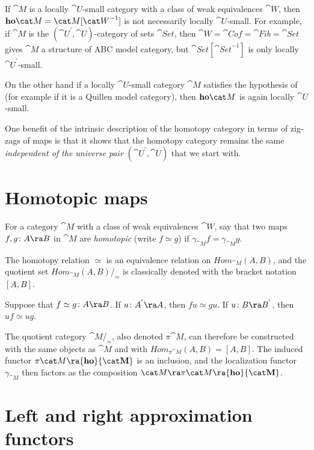 If ${\cat M}$ is a locally ${\cat U}$-small category with a class of weak equivalences ${\cat W}$, then ${\bf ho}{\cat M} = {\cat M}[{\cat W}^{-1}]$ is not necessarily locally ${\cat U}$-small. For example, if ${\cat M}$ is the $({\cat U}^{'}, {\cat U})$-category of sets ${\cat Set}$, then ${\cat W} = {\cat Cof} = {\cat Fib} = {\cat Set}$  gives ${\cat M}$ a structure of ABC model category, but ${\cat Set}[{\cat Set}^{-1}]$ is only locally ${\cat U}^{'}$-small. 

On the other hand if a locally ${\cat U}$-small category ${\cat M}$ satisfies the hypothesis of  (for example if it is a Quillen model category), then ${\bf ho}{\cat M}$ is again locally ${\cat U}$-small.

One benefit of the intrinsic description of the homotopy category in terms of zig-zags of maps is that it shows that the homotopy category remains the same {\it independent of the universe pair} $({\cat U}^{'}, {\cat U})$ that we start with.

\section{Homotopic maps}
\label{sec:generalhomotopicmaps}

\begin{defn}
\label{defn:homotopicmaps}
For a category ${\cat M}$ with a class of weak equivalences ${\cat W}$, say that two maps $f, g \colon A \ra B$ in ${\cat M}$ are {\it homotopic} (write $f \simeq g$) if $\gamma_{\cat M} f = \gamma_{\cat M} g$.
\end{defn}

The homotopy relation $\simeq$ is an equivalence relation on $Hom_{\cat M}(A, B)$, and the quotient set $Hom_{\cat M}(A, B) / _\simeq$ is classically denoted with the bracket notation $[A, B]$. 

Suppose that $f \simeq g \colon A \ra B$. If $u \colon A^{'} \ra A$, then $fu \simeq gu$. If $u \colon B \ra B^{'}$, then $uf \simeq ug$. 

The quotient category ${\cat M}/_\simeq$, also denoted $\pi {\cat M}$, can therefore be constructed with the same objects as ${\cat M}$ and with $Hom_{\pi {\cat M}} (A, B) = [A, B]$. The induced functor $\pi {\cat M} \ra {\bf ho}{\cat M}$ is an inclusion, and the localization functor $\gamma_{\cat M}$ then factors as the composition ${\cat M} \ra \pi {\cat M} \ra {\bf ho}{\cat M}$.

\section{Left and right approximation functors}
\label{sec:approximationfunctors}

